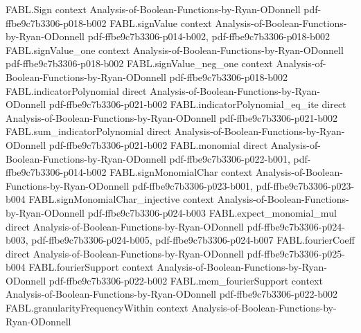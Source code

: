 \begin{theorem}
\label{FABL.influence_eq_sum_sq_fourierCoeff}
\leanok
{}
\proofstep
  {FABL.Sign}
  {context}
  {Analysis-of-Boolean-Functions-by-Ryan-ODonnell}
  {pdf-ffbe9c7b3306-p018-b002}
\proofstep
  {FABL.signValue}
  {context}
  {Analysis-of-Boolean-Functions-by-Ryan-ODonnell}
  {pdf-ffbe9c7b3306-p014-b002,
    pdf-ffbe9c7b3306-p018-b002}
\proofstep
  {FABL.signValue_one}
  {context}
  {Analysis-of-Boolean-Functions-by-Ryan-ODonnell}
  {pdf-ffbe9c7b3306-p018-b002}
\proofstep
  {FABL.signValue_neg_one}
  {context}
  {Analysis-of-Boolean-Functions-by-Ryan-ODonnell}
  {pdf-ffbe9c7b3306-p018-b002}
\proofstep
  {FABL.indicatorPolynomial}
  {direct}
  {Analysis-of-Boolean-Functions-by-Ryan-ODonnell}
  {pdf-ffbe9c7b3306-p021-b002}
\proofstep
  {FABL.indicatorPolynomial_eq_ite}
  {direct}
  {Analysis-of-Boolean-Functions-by-Ryan-ODonnell}
  {pdf-ffbe9c7b3306-p021-b002}
\proofstep
  {FABL.sum_indicatorPolynomial}
  {direct}
  {Analysis-of-Boolean-Functions-by-Ryan-ODonnell}
  {pdf-ffbe9c7b3306-p021-b002}
\proofstep
  {FABL.monomial}
  {direct}
  {Analysis-of-Boolean-Functions-by-Ryan-ODonnell}
  {pdf-ffbe9c7b3306-p022-b001,
    pdf-ffbe9c7b3306-p014-b002}
\proofstep
  {FABL.signMonomialChar}
  {context}
  {Analysis-of-Boolean-Functions-by-Ryan-ODonnell}
  {pdf-ffbe9c7b3306-p023-b001,
    pdf-ffbe9c7b3306-p023-b004}
\proofstep
  {FABL.signMonomialChar_injective}
  {context}
  {Analysis-of-Boolean-Functions-by-Ryan-ODonnell}
  {pdf-ffbe9c7b3306-p024-b003}
\proofstep
  {FABL.expect_monomial_mul}
  {direct}
  {Analysis-of-Boolean-Functions-by-Ryan-ODonnell}
  {pdf-ffbe9c7b3306-p024-b003,
    pdf-ffbe9c7b3306-p024-b005,
    pdf-ffbe9c7b3306-p024-b007}
\proofstep
  {FABL.fourierCoeff}
  {direct}
  {Analysis-of-Boolean-Functions-by-Ryan-ODonnell}
  {pdf-ffbe9c7b3306-p025-b004}
\proofstep
  {FABL.fourierSupport}
  {context}
  {Analysis-of-Boolean-Functions-by-Ryan-ODonnell}
  {pdf-ffbe9c7b3306-p022-b002}
\proofstep
  {FABL.mem_fourierSupport}
  {context}
  {Analysis-of-Boolean-Functions-by-Ryan-ODonnell}
  {pdf-ffbe9c7b3306-p022-b002}
\proofstep
  {FABL.granularityFrequencyWithin}
  {context}
  {Analysis-of-Boolean-Functions-by-Ryan-ODonnell}

\end{theorem}
